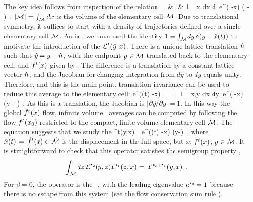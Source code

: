 The key idea follows from inspection of the relation
\bea
{}_\pS
&=& {1 \over {|\pS|}} \int_{x \in \pS \atop {} \in \hM}
dx d\,
e^{\beta \cdot ( -x) }
\delta( - )~.
\nnu
\eea
 ${|{\cal M}|=\int_{{\cal M}} dx}$ is the volume of the elementary cell ${\cal M}$.
Due to translational symmetry, it suffices to start with
a density of trajectories defined over a single elementary
cell ${\cal M}$.
As in , we have used the identity
$ 1 =  {\int_{{\cal M}}{\!d y}\:} \delta\negthinspace\left( {y - \hat x(t)} \right)$ to motivate the introduction
of the {\evOper} $ {\cal L}^t(\hat{y},x)$.
There is a unique lattice translation $\hat n$ such that
$\hat{y}=y - \hat n$, with the endpoint $y \in {\cal M}$
translated back to the elementary cell, and
${f^{t}(x)}$ given by . The difference is a
translation by a constant lattice vector $\hat n$,
and the Jacobian for changing integration
from $d\hat{y}$ to $dy$ equals unity.
Therefore, and this is the main point, translation invariance
can be used to reduce this average to the elementary cell:
\beq
\langle e^{\beta \cdot (\hx(t) -x) } \rangle_\pS
\,=\, {1 \over {|\pS|}} \int_{x,y \in \pS} dx dy\,
e^{\beta \cdot ( -x) }
\delta(y - )~.
As this is a translation, the Jacobian is
$|\partial \hat{y}/\partial y| = 1$.
In this way the global $\hflow{t}{x}$ flow,
infinite volume \statesp\ averages can be computed
by following the flow $\flow{t}{\xInit}$ restricted to the
compact, finite volume elementary cell $\pS$.
The equation  suggests that we study the
\evOper
\beq
\Lop^t(y,x)\,=\,e^{\beta \cdot (\hx(t) -x) } \delta(y-)
\,,
where $\hx(t)\,=\,\hflow{t}{x} \in \hM$ is the displacement in the
full space, but $x$, $\flow{t}{x}$, $y \in \pS$.
It is straightforward to check that
this operator satisfies the semigroup property ,
\[
\int_{\pS} dz\,
\Lop^{t_2}(y,z) \Lop^{t_1}(z,x) \,=\,
\Lop^{t_2+t_1}(y,x)~
\,.
\]
For $\beta=0$, the operator  is the
\FPoper\ , with the
leading eigenvalue $e^{s_0}=1$ because there is no escape from
this system (see
the flow conservation sum rule ).

